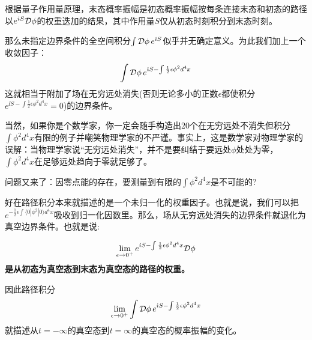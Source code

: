 \documentclass[CJK]{beamer}
\begin{document}
\begin{frame}
\bch
根据量子作用量原理，末态概率振幅是初态概率振幅按每条连接末态和初态的路径以$e^{iS}{\mathcal{D}}\phi$的权重迭加的结果，其中作用量$S$仅从初态时刻积分到末态时刻。
\skipline

那么未指定边界条件的全空间积分$\int {\mathcal{D}}\phi \, e^{{\dot{\imath}} S} $似乎并无确定意义。为此我们加上一个收敛因子：
$$\int {\mathcal{D}}\phi \, e^{{\dot{\imath}} S - \int \frac{1}{2}\epsilon\phi^2d^4x}$$
这就相当于附加了场在无穷远处消失(否则无论多小的正数$\epsilon$都使积分$e^{\ii S-\int \frac{1}{2}\epsilon\phi^2d^4x}=0$)的边界条件。
\skipline

{\scriptsize 当然，如果你是个数学家，你一定会随手构造出20个在无穷远处不消失但积分$\int \phi^2d^4x$有限的例子并嘲笑物理学家的不严谨。事实上，这是数学家对物理学家的误解：当物理学家说“无穷远处消失”，并不是要纠结于要远处$\phi$处处为零，$\int\phi^2d^4x$在足够远处趋向于零就足够了。
}
\ech
\end{frame}


\begin{frame}
\bch
{\small
问题又来了：因零点能的存在，要测量到有限的$\int\phi^2d^4x$是不可能的?

好在路径积分本来就描述的是一个未归一化的权重因子。也就是说，我们可以把$e^{-\frac{1}{2}\epsilon\int \langle 0 |\phi^2|0\rangle d^4x}$吸收到归一化因数里。那么，场从无穷远处消失的边界条件就退化为真空边界条件。也就是说:
\skipline}
 
{\bf $$\lim_{\epsilon\rightarrow 0^+}e^{{\dot{\imath}} S-\int \frac{1}{2}\epsilon\phi^2d^4x}{\mathcal{D}}\phi$$是从初态为真空态到末态为真空态的路径的权重。}

因此路径积分
$$\lim_{\epsilon\rightarrow 0^+} \int {\mathcal{D}}\phi \,e^{{\dot{\imath}} S-\int \frac{1}{2}\epsilon\phi^2d^4x}$$
就描述从$t = -\infty$的真空态到$t=\infty$的真空态的概率振幅的变化。

\ech
\end{frame}
\end{document}

